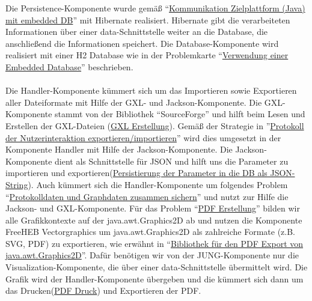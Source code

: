 \documentclass[enabledeprecatedfontcommands,fontsize=11pt,paper=a4,twoside]{scrartcl}
\newcounter{one}
\begin{document}
Die Persistence-Komponente wurde gemäß “\hyperlink{rrr}{Kommunikation Zielplattform (Java) mit embedded DB}” mit Hibernate realisiert.
Hibernate gibt die verarbeiteten Informationen über einer data-Schnittstelle weiter an die Database, die anschließend die Informationen speichert. Die Database-Komponente wird realisiert mit einer H2 Database wie in der Problemkarte “\hyperlink{ppp}{Verwendung einer Embedded Database}” beschrieben.\\ \\

Die Handler-Komponente kümmert sich um das Importieren sowie Exportieren aller Dateiformate mit Hilfe der GXL- und Jackson-Komponente. Die GXL-Komponente stammt von der Bibliothek “SourceForge” und hilft beim Lesen und Erstellen der GXL-Dateien (\hyperlink{ttt}{GXL Erstellung}). Gemäß der Strategie in ”\hyperlink{jjj}{Protokoll der Nutzerinteraktion exportieren/importieren}” wird dies umgesetzt in der Komponente Handler mit Hilfe der Jackson-Komponente. Die Jackson-Komponente dient als Schnittstelle für JSON und hilft uns die Parameter zu importieren und exportieren(\hyperlink{www}{Persistierung der Parameter in die DB als JSON-String}).
Auch kümmert sich die Handler-Komponente um folgendes Problem “\hyperlink{ooo}{Protokolldaten und Graphdaten zusammen sichern}” und nutzt zur Hilfe die Jackson- und GXL-Komponente.
Für das Problem “\hyperlink{hhh}{PDF Erstellung}” bilden wir alle Grafikkontexte auf der java.awt.Graphics2D ab und nutzen die Komponente FreeHEB Vectorgraphics um java.awt.Graphics2D als zahlreiche Formate (z.B. SVG, PDF) zu exportieren, wie erwähnt in “\hyperlink{iii}{Bibliothek für den PDF Export von java.awt.Graphics2D}”. Dafür benötigen wir von der JUNG-Komponente nur die Visualization-Komponente, die über einer data-Schnittstelle übermittelt wird. Die Grafik wird der Handler-Komponente übergeben und die kümmert sich dann um das Drucken(\hyperlink{ggg}{PDF Druck}) und Exportieren der PDF. \\ \\
\end{document}
